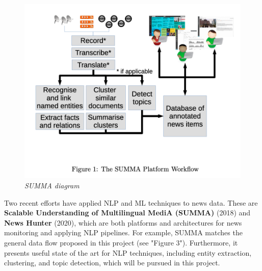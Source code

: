 \documentclass[11pt]{article}
\begin{document}
\begin{figure}
  \centerline{\includegraphics[scale=0.4]{literature-review--summa.png}}
  \caption{\textit{SUMMA diagram}}
\end{figure}

Two recent efforts have applied NLP and ML techniques to news data. These are \textbf{Scalable Understanding of Multilingual MediA (SUMMA)} \cite{germann2018integrating} (2018) and \textbf{News Hunter} \cite{berven2020knowledge} (2020), which are both platforms and architectures for news monitoring and applying NLP pipelines. For example, SUMMA matches the general data flow proposed in this project (see "Figure 3"). Furthermore, it presents useful state of the art for NLP techniques, including entity extraction, clustering, and topic detection, which will be pursued in this project.
\end{document}
